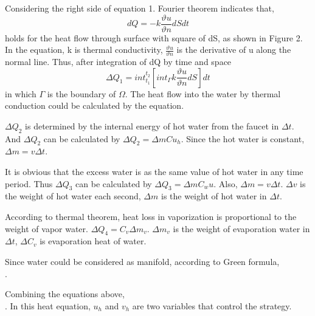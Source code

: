 \documentclass[12pt,a4paper,titlepage]{article}
\begin{document}
Considering the right side of equation 1.
Fourier theorem indicates that,
\begin{equation}
 dQ=-k\frac{\vartheta u}{\vartheta n}dSdt
\end{equation}
holds for the heat flow through surface with square of dS, as shown in Figure 2.
In the equation, k is thermal conductivity, $\frac{\vartheta u}{\vartheta n}$ is the derivative of u along the normal line. Thus, after integration of dQ by time and space
\begin{equation}
 \Delta Q_1=int_{t_1}^{t_2}[{int_{\Gamma}}k\frac{\vartheta u}{\vartheta n}dS]dt
\end{equation}
in which $\Gamma$ is the boundary of $\Omega$.
The heat flow into the water by thermal conduction could be calculated by the equation.

$\Delta Q_2$ is determined by the internal energy of hot water from the faucet in $\Delta t$.
And $\Delta Q_2$ can be calculated by
$\Delta Q_2={\Delta m}C{u_h}$.
Since the hot water is constant,
$\Delta m=v{\Delta t}$.

It is obvious that the excess water is as the same value of hot water in any time period.
Thus $\Delta Q_3$ can be calculated by
$\Delta Q_3={\Delta m}{C_w}u$.
Also, $\Delta m=v{\Delta t}$.
$\Delta v$ is the weight of hot water each second, $\Delta m$ is the weight of hot water in $\Delta t$.

According to thermal theorem, heat loss in vaporization is proportional to the weight of vapor water.
$\Delta Q_4={C_v}\Delta {m_v}$.
$\Delta {m_v}$ is the weight of evaporation water in $\Delta t$, $\Delta {C_v}$ is evaporation heat of water.

Since water could be considered as manifold, according to Green formula,
\begin{equation}
\end{equation}.

Combining the equations above,
\begin{equation}
\end{equation}.
In this heat equation, $u_h$ and $v_h$ are two variables that control the strategy.
\end{document}
